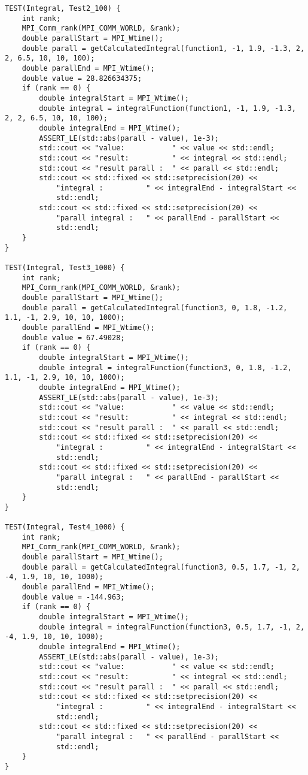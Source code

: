 \documentclass{report}
\begin{document}
\begin{lstlisting}
TEST(Integral, Test2_100) {
    int rank;
    MPI_Comm_rank(MPI_COMM_WORLD, &rank);
    double parallStart = MPI_Wtime();
    double parall = getCalculatedIntegral(function1, -1, 1.9, -1.3, 2, 2, 6.5, 10, 10, 100);
    double parallEnd = MPI_Wtime();
    double value = 28.826634375;
    if (rank == 0) {
        double integralStart = MPI_Wtime();
        double integral = integralFunction(function1, -1, 1.9, -1.3, 2, 2, 6.5, 10, 10, 100);
        double integralEnd = MPI_Wtime();
        ASSERT_LE(std::abs(parall - value), 1e-3);
        std::cout << "value:           " << value << std::endl;
        std::cout << "result:          " << integral << std::endl;
        std::cout << "result parall :  " << parall << std::endl;
        std::cout << std::fixed << std::setprecision(20) <<
            "integral :          " << integralEnd - integralStart <<
            std::endl;
        std::cout << std::fixed << std::setprecision(20) <<
            "parall integral :   " << parallEnd - parallStart <<
            std::endl;
    }
}

TEST(Integral, Test3_1000) {
    int rank;
    MPI_Comm_rank(MPI_COMM_WORLD, &rank);
    double parallStart = MPI_Wtime();
    double parall = getCalculatedIntegral(function3, 0, 1.8, -1.2, 1.1, -1, 2.9, 10, 10, 1000);
    double parallEnd = MPI_Wtime();
    double value = 67.49028;
    if (rank == 0) {
        double integralStart = MPI_Wtime();
        double integral = integralFunction(function3, 0, 1.8, -1.2, 1.1, -1, 2.9, 10, 10, 1000);
        double integralEnd = MPI_Wtime();
        ASSERT_LE(std::abs(parall - value), 1e-3);
        std::cout << "value:           " << value << std::endl;
        std::cout << "result:          " << integral << std::endl;
        std::cout << "result parall :  " << parall << std::endl;
        std::cout << std::fixed << std::setprecision(20) <<
            "integral :          " << integralEnd - integralStart <<
            std::endl;
        std::cout << std::fixed << std::setprecision(20) <<
            "parall integral :   " << parallEnd - parallStart <<
            std::endl;
    }
}

TEST(Integral, Test4_1000) {
    int rank;
    MPI_Comm_rank(MPI_COMM_WORLD, &rank);
    double parallStart = MPI_Wtime();
    double parall = getCalculatedIntegral(function3, 0.5, 1.7, -1, 2, -4, 1.9, 10, 10, 1000);
    double parallEnd = MPI_Wtime();
    double value = -144.963;
    if (rank == 0) {
        double integralStart = MPI_Wtime();
        double integral = integralFunction(function3, 0.5, 1.7, -1, 2, -4, 1.9, 10, 10, 1000);
        double integralEnd = MPI_Wtime();
        ASSERT_LE(std::abs(parall - value), 1e-3);
        std::cout << "value:           " << value << std::endl;
        std::cout << "result:          " << integral << std::endl;
        std::cout << "result parall :  " << parall << std::endl;
        std::cout << std::fixed << std::setprecision(20) <<
            "integral :          " << integralEnd - integralStart <<
            std::endl;
        std::cout << std::fixed << std::setprecision(20) <<
            "parall integral :   " << parallEnd - parallStart <<
            std::endl;
    }
}


\end{lstlisting}
\end{document}

